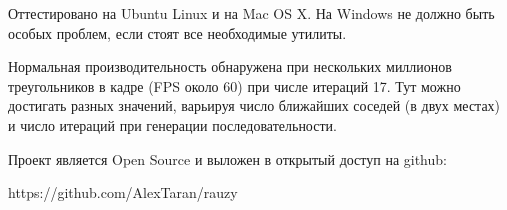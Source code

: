 \documentclass{article}
\begin{document}
Оттестировано на Ubuntu Linux и на Mac OS X. На Windows не должно быть особых проблем, если стоят все необходимые утилиты.

Нормальная производительность обнаружена при нескольких миллионов треугольников в кадре (FPS около 60) при числе итераций 17. Тут можно достигать разных значений, варьируя число ближайших соседей (в двух местах) и число итераций при генерации последовательности.


Проект является Open Source и выложен в открытый доступ на github: 

https://github.com/AlexTaran/rauzy
\end{document}
